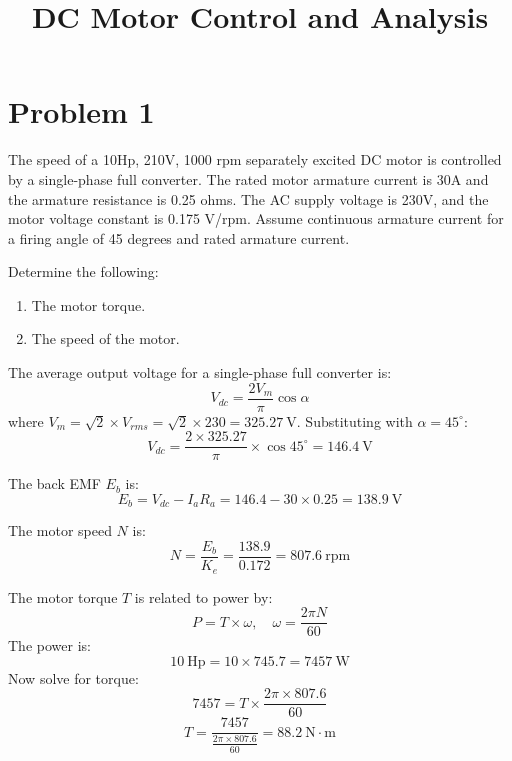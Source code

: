\documentclass[12pt]{article}
\title{DC Motor Control and Analysis}
\author{}
\date{}
\begin{document}
	\maketitle
	\vspace{-5em} %
	
	\section*{Problem 1}
	The speed of a 10Hp, 210V, 1000 rpm separately excited DC motor is controlled by a single-phase full converter. The rated motor armature current is 30A and the armature resistance is 0.25 ohms. The AC supply voltage is 230V, and the motor voltage constant is 0.175 V/rpm. Assume continuous armature current for a firing angle of 45 degrees and rated armature current.
	
	Determine the following:	\begin{enumerate}
		\item The motor torque.
		\item The speed of the motor.
	\end{enumerate}
	
    \maketitle
    
    \noindent The average output voltage for a single-phase full converter is:
    \[
    V_{dc} = \frac{2V_m}{\pi} \cos \alpha
    \]
    where \( V_m = \sqrt{2} \times V_{rms} = \sqrt{2} \times 230 = 325.27\ \text{V} \). Substituting with \( \alpha = 45^\circ \):
    \[
    V_{dc} = \frac{2 \times 325.27}{\pi} \times \cos 45^\circ = 146.4\ \text{V}
    \]
    
    \noindent The back EMF \( E_b \) is:
    \[
    E_b = V_{dc} - I_a R_a = 146.4 - 30 \times 0.25 = 138.9\ \text{V}
    \]
    
    \noindent The motor speed \( N \) is:
    \[
    N = \frac{E_b}{K_e} = \frac{138.9}{0.172} = 807.6\ \text{rpm}
    \]
    
    \noindent The motor torque \( T \) is related to power by:
    \[
    P = T \times \omega, \quad \omega = \frac{2\pi N}{60}
    \]
    The power is:
    \[
    10\ \text{Hp} = 10 \times 745.7 = 7457\ \text{W}
    \]
    Now solve for torque:
    \[
    7457 = T \times \frac{2\pi \times 807.6}{60}
    \]
    \[
    T = \frac{7457}{\frac{2\pi \times 807.6}{60}} = 88.2\ \text{N}\cdot\text{m}
    \]
\end{document}
